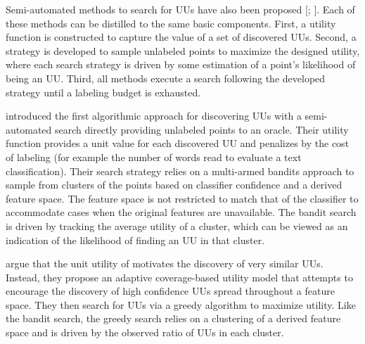 \documentclass[letterpaper]{article} %
\begin{document}
Semi-automated methods to search for UUs have also been proposed [\citealt{Lakkaraju2016}; \citealt{Bansal2018}].  Each of these methods can be distilled to the same basic components.  First, a utility function is constructed to capture the value of a set of discovered UUs. Second, a strategy is developed to sample unlabeled points to maximize the designed utility, where each search strategy is driven by some estimation of a point's likelihood of being an UU.  Third, all methods execute a search following the developed strategy until a labeling budget is exhausted.

\citet{Lakkaraju2016} introduced the first algorithmic approach for discovering UUs with a semi-automated search directly providing unlabeled points to an oracle.  Their utility function provides a unit value for each discovered UU and penalizes by the cost of labeling (for example the number of words read to evaluate a text classification). Their search strategy relies on a multi-armed bandits approach to sample from clusters of the points based on classifier confidence and a derived feature space.  The feature space is not restricted to match that of the classifier to accommodate cases when the original features are unavailable.  The bandit search is driven by tracking the average utility of a cluster, which can be viewed as an indication of the likelihood of finding an UU in that cluster. 

\citet{Bansal2018} argue that the unit utility of \citet{Lakkaraju2016} motivates the discovery of very similar UUs. Instead, they propose an adaptive coverage-based utility model that attempts to encourage the discovery of high confidence UUs spread throughout a feature space. They then search for UUs via a greedy algorithm to maximize utility.  Like the bandit search, the greedy search relies on a clustering of a derived feature space and is driven by the observed ratio of UUs in each cluster. 
\end{document}
